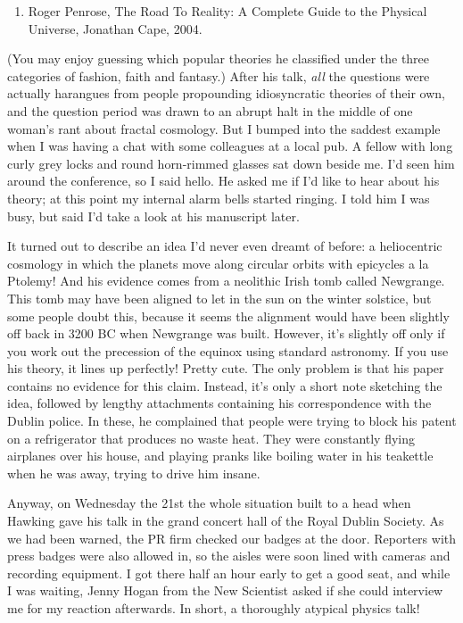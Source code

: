 \documentclass{article}
\def\tightlist{}
\begin{document}
\begin{enumerate}
\def\labelenumi{\arabic{enumi})}
\setcounter{enumi}{1}
\tightlist
\item
  Roger Penrose, The Road To Reality: A Complete Guide to the Physical
  Universe, Jonathan Cape, 2004.
\end{enumerate}

(You may enjoy guessing which popular theories he classified under the
three categories of fashion, faith and fantasy.) After his talk,
\emph{all} the questions were actually harangues from people propounding
idiosyncratic theories of their own, and the question period was drawn
to an abrupt halt in the middle of one woman's rant about fractal
cosmology. But I bumped into the saddest example when I was having a
chat with some colleagues at a local pub. A fellow with long curly grey
locks and round horn-rimmed glasses sat down beside me. I'd seen him
around the conference, so I said hello. He asked me if I'd like to hear
about his theory; at this point my internal alarm bells started ringing.
I told him I was busy, but said I'd take a look at his manuscript later.

It turned out to describe an idea I'd never even dreamt of before: a
heliocentric cosmology in which the planets move along circular orbits
with epicycles a la Ptolemy! And his evidence comes from a neolithic
Irish tomb called Newgrange. This tomb may have been aligned to let in
the sun on the winter solstice, but some people doubt this, because it
seems the alignment would have been slightly off back in 3200 BC when
Newgrange was built. However, it's slightly off only if you work out the
precession of the equinox using standard astronomy. If you use his
theory, it lines up perfectly! Pretty cute. The only problem is that his
paper contains no evidence for this claim. Instead, it's only a short
note sketching the idea, followed by lengthy attachments containing his
correspondence with the Dublin police. In these, he complained that
people were trying to block his patent on a refrigerator that produces
no waste heat. They were constantly flying airplanes over his house, and
playing pranks like boiling water in his teakettle when he was away,
trying to drive him insane.

Anyway, on Wednesday the 21st the whole situation built to a head when
Hawking gave his talk in the grand concert hall of the Royal Dublin
Society. As we had been warned, the PR firm checked our badges at the
door. Reporters with press badges were also allowed in, so the aisles
were soon lined with cameras and recording equipment. I got there half
an hour early to get a good seat, and while I was waiting, Jenny Hogan
from the New Scientist asked if she could interview me for my reaction
afterwards. In short, a thoroughly atypical physics talk!
\end{document}
